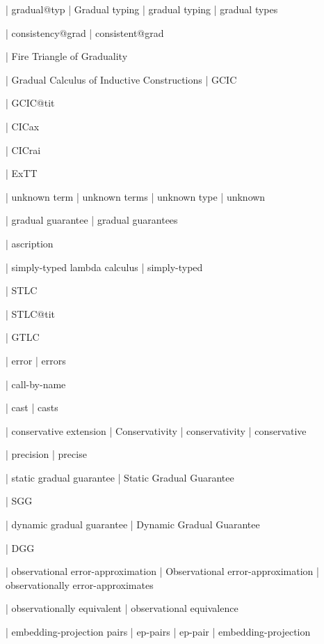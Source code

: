   | gradual@typ
  | Gradual typing
  | gradual typing
  | gradual types

  | consistency@grad
  | consistent@grad

  | Fire Triangle of Graduality

  | Gradual Calculus of Inductive Constructions
  | GCIC

  | GCIC@tit


  | CICax

  | CICrai

  | ExTT

  | unknown term
  | unknown terms
  | unknown type
  | unknown

  | gradual guarantee
  | gradual guarantees

  | ascription

  | simply-typed lambda calculus
  | simply-typed

  | STLC

  | STLC@tit

  | GTLC

  | error
  | errors

  | call-by-name

  | cast
  | casts

  | conservative extension
  | Conservativity
  | conservativity
  | conservative

  | precision
  | precise

  | static gradual guarantee
  | Static Gradual Guarantee

  | SGG

  | dynamic gradual guarantee
  | Dynamic Gradual Guarantee

  | DGG

  | observational error-approximation
  | Observational error-approximation
  | observationally error-approximates

  | observationally equivalent
  | observational equivalence

  | embedding-projection pairs
  | ep-pairs
  | ep-pair
  | embedding-projection

